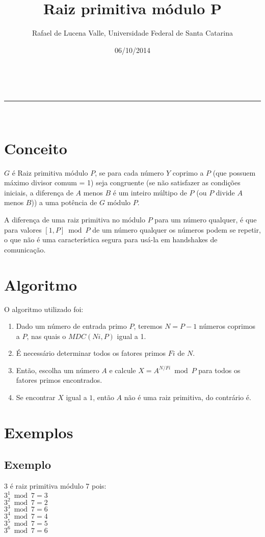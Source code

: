 \documentclass[a4paper,11pt]{article}
\makeatletter
\newcommand{\linia}{\rule{\linewidth}{0.5pt}}
\theoremstyle{mytheor}
\renewcommand{\maketitle}{
\begin{center}
\vspace{2ex}
{\huge \textsc{\@title}}
\vspace{1ex}
\\
\linia\\
\@author \hfill \@date
\vspace{4ex}
\end{center}
}
\makeatother
\begin{document}
\title{Raiz primitiva módulo P}

\author{Rafael de Lucena Valle, Universidade Federal de Santa Catarina}

\date{06/10/2014}

\maketitle

\section*{Conceito}
$G$ é Raiz primitiva módulo $P$, se para cada número $Y$ coprimo a $P$ (que possuem máximo divisor comum = 1) seja congruente (se não satisfazer as condições iniciais, a diferença de $A$ menos $B$ é um inteiro múltipo de $P$ (ou $P$ divide $A$ menos $B$)) a uma potência de $G$ módulo $P$.

A diferença de uma raiz primitiva no módulo $P$ para um número qualquer, é que para valores $[1, P] \bmod P$ de um número qualquer os números podem se repetir, o que não é uma característica segura para usá-la em handshakes de comunicação.
\section*{Algoritmo}
O algoritmo utilizado foi:

\begin{enumerate}
\item Dado um número de entrada primo $P$, teremos $N=P-1$ números coprimos a $P$, nas quais o $MDC(Ni,P)$ igual a 1.
\item É necessário determinar todos os fatores primos $Fi$ de $N$.
\item Então, escolha um número $A$ e calcule $X = A^{N/Fi} \bmod P$ para todos os fatores primos encontrados.
\item Se encontrar $X$ igual a $1$, então $A$ não é uma raiz primitiva, do contrário é.
\end{enumerate}

\section*{Exemplos}
\subsection*{Exemplo}
3 é raiz primitiva módulo 7 pois:\\
$3^1 \bmod7 = 3$\\
$3^2 \bmod 7 = 2$\\
$3^3 \bmod 7 = 6$\\
$3^4 \bmod 7 = 4$\\
$3^5 \bmod 7 = 5$\\
$3^6 \bmod 7 = 6$\\
\end{document}
